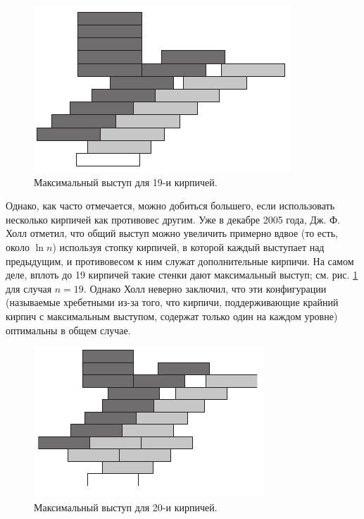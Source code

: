 \begin{figure}[htb!]
\centering
\includegraphics[scale=1]{pics/kirpich2}
\caption{Максимальный выступ для 19-и кирпичей.}
\label{pic:kirpich2}
\end{figure}

Однако, как часто отмечается, можно добиться большего, если использовать несколько кирпичей как противовес другим.
Уже в декабре 2005 года, Дж. Ф. Холл \cite{35} отметил, что общий выступ можно увеличить примерно вдвое (то есть, около $\ln n$) используя стопку кирпичей, в которой каждый выступает над предыдущим, и противовесом к ним служат дополнительные кирпичи. %
На самом деле, вплоть до 19 кирпичей такие стенки дают максимальный выступ; см. рис. \ref{pic:kirpich2} для случая $n = 19$.
Однако Холл неверно заключил, что эти конфигурации (называемые хребетными из-за того, что кирпичи, поддерживающие крайний кирпич с максимальным выступом, содержат только один на каждом уровне) оптимальны в общем случае.

\begin{figure}[htb!]
\centering
\includegraphics[scale=1]{pics/kirpich3}
\caption{Максимальный выступ для 20-и кирпичей.}
\label{pic:kirpich3}
\end{figure}

